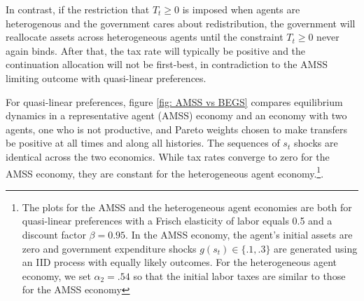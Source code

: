 \documentclass[thmsb,11pt]{article}
\begin{document}
In contrast, if the restriction that $T_t \geq 0$ is imposed when agents are heterogenous and the
government cares about redistribution,  the government will reallocate assets across  heterogeneous agents until the constraint $T_t \geq 0$ never again binds.  After that, the tax rate will typically be positive and the
continuation allocation will not be  first-best, in contradiction to the AMSS limiting outcome with quasi-linear preferences.

For quasi-linear preferences, figure \ref{fig: AMSS vs BEGS} compares equilibrium dynamics in a
representative agent (AMSS) economy and an economy with two agents, one who
is not productive, and  Pareto weights chosen to make
transfers be positive at all times  and along all  histories. The sequences of $s_t$ shocks are identical across the two economics.
 While tax rates converge to zero for the AMSS economy, they are constant for the heterogeneous agent economy.\footnote{The plots for the AMSS and the heterogeneous agent economies are both  for quasi-linear preferences with a Frisch elasticity of labor equals 0.5 and a discount factor $\beta=0.95$. In the AMSS economy,  the agent's  initial assets are zero  and  government expenditure shocks $g(s_t) \in\{.1,.3\}$ are generated using an IID process with equally likely outcomes.  For the heterogeneous agent economy, we set  $\alpha_2=.54$ so that the initial labor taxes are similar to those for the AMSS economy}. %
\end{document}
